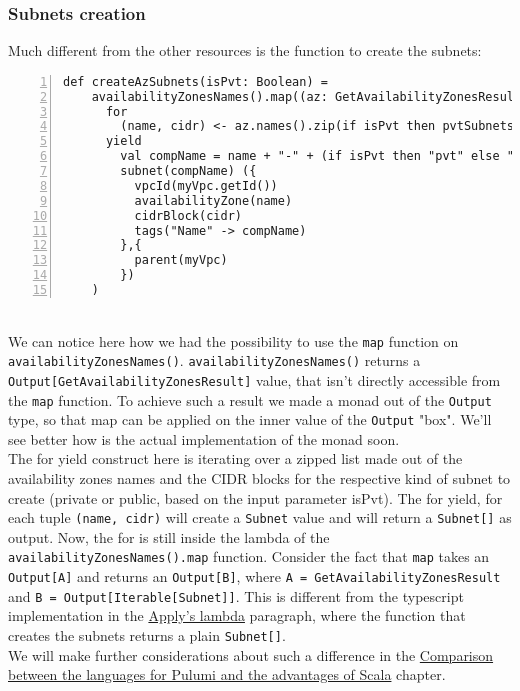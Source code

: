 \subsubsection{Subnets creation}
Much different from the other resources is the function to create the subnets:
\begin{lstlisting}[numbers=left, numberstyle=\tiny, numbersep=-5pt, stepnumber=1,linewidth=420pt]
  def createAzSubnets(isPvt: Boolean) =
    availabilityZonesNames().map((az: GetAvailabilityZonesResult) =>
      for
        (name, cidr) <- az.names().zip(if isPvt then pvtSubnetsCidrs else pubSubnetsCidrs)
      yield
        val compName = name + "-" + (if isPvt then "pvt" else "pub") + "-subnet-scala"
        subnet(compName) ({
          vpcId(myVpc.getId())
          availabilityZone(name)
          cidrBlock(cidr)
          tags("Name" -> compName)
        },{
          parent(myVpc)
        })
    )
\end{lstlisting}\mbox{}\\
We can notice here how we had the possibility to use the \texttt{map} function on \texttt{availabilityZonesNames()}.
\texttt{availabilityZonesNames()} returns a \texttt{Output[GetAvailabilityZonesResult]} value, that isn't directly accessible from the \texttt{map} function.
To achieve such a result we made a monad out of the \texttt{Output} type, so that map can be applied on the inner value of the \texttt{Output} "box".
We'll see better how is the actual implementation of the monad soon.\\
The for yield construct here is iterating over a zipped list made out of the availability zones names and the CIDR blocks for the respective kind of subnet to create (private or public, based on the input parameter isPvt).
The for yield, for each tuple \texttt{(name, cidr)} will create a \texttt{Subnet} value and will return a \texttt{Subnet[]} as output.
Now, the for is still inside the lambda of the \texttt{availabilityZonesNames().map} function.
Consider the fact that \texttt{map} takes an \texttt{Output[A]} and returns an \texttt{Output[B]}, where \texttt{A = GetAvailabilityZonesResult} and \texttt{B = Output[Iterable[Subnet]]}.
This is different from the typescript implementation in the \hyperref[par:ts-lambda]{Apply's lambda} paragraph, where the function that creates the subnets returns a plain \texttt{Subnet[]}.\\
We will make further considerations about such a difference in the \hyperref[cap:comparisons]{Comparison between the languages for Pulumi and the advantages of Scala} chapter.\\

